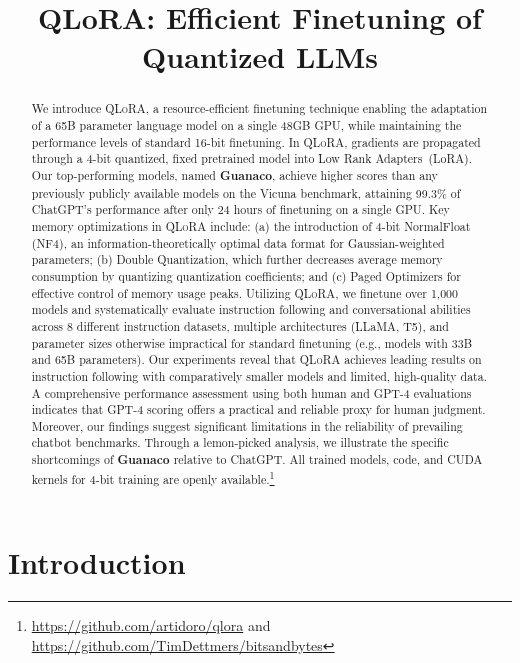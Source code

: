 \title{QLoRA: Efficient Finetuning of Quantized LLMs}

\begin{abstract}
We introduce \textsc{QLoRA}, a resource-efficient finetuning technique enabling the adaptation of a 65B parameter language model on a single 48GB GPU, while maintaining the performance levels of standard 16-bit finetuning. In \textsc{QLoRA}, gradients are propagated through a 4-bit quantized, fixed pretrained model into Low Rank Adapters~(LoRA). Our top-performing models, named \textbf{Guanaco}, achieve higher scores than any previously publicly available models on the Vicuna benchmark, attaining 99.3\% of ChatGPT's performance after only 24 hours of finetuning on a single GPU. Key memory optimizations in \textsc{QLoRA} include: (a) the introduction of 4-bit NormalFloat (NF4), an information-theoretically optimal data format for Gaussian-weighted parameters; (b) Double Quantization, which further decreases average memory consumption by quantizing quantization coefficients; and (c) Paged Optimizers for effective control of memory usage peaks. Utilizing \textsc{QLoRA}, we finetune over 1,000 models and systematically evaluate instruction following and conversational abilities across 8 different instruction datasets, multiple architectures (LLaMA, T5), and parameter sizes otherwise impractical for standard finetuning (e.g., models with 33B and 65B parameters). Our experiments reveal that \textsc{QLoRA} achieves leading results on instruction following with comparatively smaller models and limited, high-quality data. A comprehensive performance assessment using both human and GPT-4 evaluations indicates that GPT-4 scoring offers a practical and reliable proxy for human judgment. Moreover, our findings suggest significant limitations in the reliability of prevailing chatbot benchmarks. Through a lemon-picked analysis, we illustrate the specific shortcomings of \textbf{Guanaco} relative to ChatGPT. All trained models, code, and CUDA kernels for 4-bit training are openly available.\footnote{\url{https://github.com/artidoro/qlora} and \url{https://github.com/TimDettmers/bitsandbytes}}
\end{abstract}

\section{Introduction}

